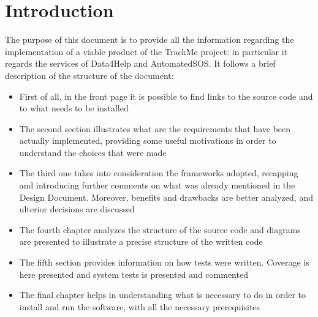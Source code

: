 \section{Introduction}
The purpose of this document is to provide all the information regarding the implementation of a viable product of the TrackMe project: in
particular it regards the services of Data4Help and AutomatedSOS. 
It follows a brief description of the structure of the document:
\begin{itemize}
\item First of all, in the front page it is possible to find links to the source code and to what needs to be installed
\item The second section illustrates what are the requirements that have been actually implemented, providing some useful motivations
in order to understand the choices that were made 
\item The third one takes into consideration the frameworks adopted, recapping and introducing further comments on what was already
mentioned in the Design Document. Moreover, benefits and drawbacks are better analyzed, and ulterior decisions are discussed
\item The fourth chapter analyzes the structure of the source code and diagrams are presented to illustrate a precise structure of
the written code 
\item The fifth section provides information on how tests were written. Coverage is here presented and system tests is presented and commented
\item The final chapter helps in understanding what is necessary to do in order to install and run the software, with all the necessary prerequisites 
\end{itemize}
